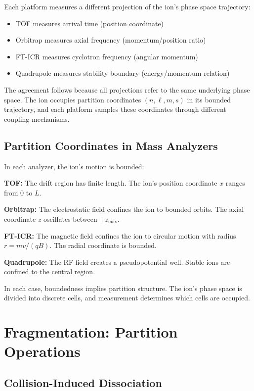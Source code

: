 \documentclass[twocolumn,10pt]{article}
\theoremstyle{remark}
\begin{document}
Each platform measures a different projection of the ion's phase space trajectory:
\begin{itemize}
    \item TOF measures arrival time (position coordinate)
    \item Orbitrap measures axial frequency (momentum/position ratio)
    \item FT-ICR measures cyclotron frequency (angular momentum)
    \item Quadrupole measures stability boundary (energy/momentum relation)
\end{itemize}

The agreement follows because all projections refer to the same underlying phase space. The ion occupies partition coordinates $(n, \ell, m, s)$ in its bounded trajectory, and each platform samples these coordinates through different coupling mechanisms.

\subsection{Partition Coordinates in Mass Analyzers}

In each analyzer, the ion's motion is bounded:

\textbf{TOF:} The drift region has finite length. The ion's position coordinate $x$ ranges from 0 to $L$.

\textbf{Orbitrap:} The electrostatic field confines the ion to bounded orbits. The axial coordinate $z$ oscillates between $\pm z_{\max}$.

\textbf{FT-ICR:} The magnetic field confines the ion to circular motion with radius $r = mv/(qB)$. The radial coordinate is bounded.

\textbf{Quadrupole:} The RF field creates a pseudopotential well. Stable ions are confined to the central region.

In each case, boundedness implies partition structure. The ion's phase space is divided into discrete cells, and measurement determines which cells are occupied.


\section{Fragmentation: Partition Operations}
\label{sec:fragmentation}

\subsection{Collision-Induced Dissociation}
\end{document}
